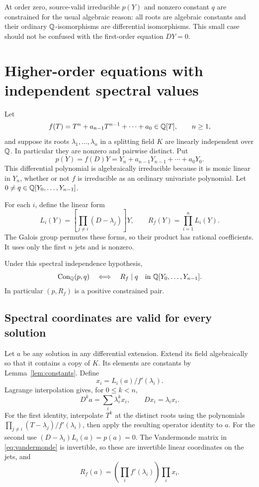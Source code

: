 \documentclass[11pt]{article}
\begin{document}
At order zero, source-valid irreducible $p(Y)$ and nonzero constant
$q$ are constrained for the usual algebraic reason: all roots are
algebraic constants and their ordinary $\mathbb Q$-isomorphisms are
differential isomorphisms. This small case should not be confused
with the first-order equation $DY=0$.

\section{Higher-order equations with independent spectral values}

Let
\[
 f(T)=T^n+a_{n-1}T^{n-1}+\cdots+a_0\in\mathbb Q[T],\qquad n\ge1,
\]
and suppose its roots $\lambda_1,\ldots,\lambda_n$ in a splitting
field $K$ are linearly independent over $\mathbb Q$. In particular they
are nonzero and pairwise distinct. Put
\[
 p(Y)=f(D)Y=Y_n+a_{n-1}Y_{n-1}+\cdots+a_0Y_0.
\]
This differential polynomial is algebraically irreducible because
it is monic linear in $Y_n$, whether or not $f$ is irreducible as
an ordinary univariate polynomial. Let
$0\ne q\in\mathbb Q[Y_0,\ldots,Y_{n-1}]$.

For each $i$, define the linear form
\[
 L_i(Y)=\left[\prod_{j\ne i}(D-\lambda_j)\right]Y,
 \qquad R_f(Y)=\prod_{i=1}^n L_i(Y).
\]
The Galois group permutes these forms, so their product has rational
coefficients. It uses only the first $n$ jets and is nonzero.

\begin{theorem}\label{thm:spectral}
Under this spectral independence hypothesis,
\[
 \operatorname{Con}_\mathbb Q(p,q)\quad\Longleftrightarrow\quad
 R_f\mid q\quad\text{in }\mathbb Q[Y_0,\ldots,Y_{n-1}].
\]
In particular $(p,R_f)$ is a positive constrained pair.
\end{theorem}

\subsection{Spectral coordinates are valid for every solution}

Let $a$ be any solution in any differential extension. Extend its
field algebraically so that it contains a copy of $K$. Its elements
are constants by Lemma~\ref{lem:constants}. Define
\[
 x_i=L_i(a)/f'(\lambda_i).
\]
Lagrange interpolation gives, for $0\le k<n$,
\begin{equation}\label{eq:vandermonde}
 D^ka=\sum_i\lambda_i^k x_i,
 \qquad Dx_i=\lambda_i x_i.
\end{equation}
For the first identity, interpolate $T^k$ at the distinct roots
using the polynomials
$\prod_{j\ne i}(T-\lambda_j)/f'(\lambda_i)$, then apply the resulting
operator identity to $a$. For the second use
$(D-\lambda_i)L_i(a)=p(a)=0$.
The Vandermonde matrix in \eqref{eq:vandermonde} is invertible, so
these are invertible linear coordinates on the jets, and
\begin{equation}\label{eq:product}
 R_f(a)=\left(\prod_i f'(\lambda_i)\right)\prod_i x_i.
\end{equation}
\end{document}
